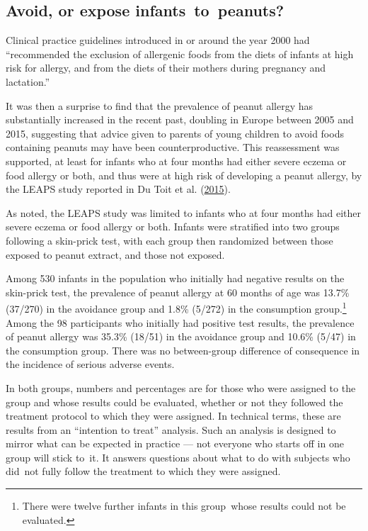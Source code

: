 \documentclass[
  10pt,
  b5paper]{book}
\begin{document}
\hypertarget{avoid-or-expose-infants-to-peanuts}{%
\subsection{Avoid, or expose infants~to~peanuts?}\label{avoid-or-expose-infants-to-peanuts}}

Clinical practice guidelines introduced in or around the year 2000 had
``recommended the exclusion of allergenic foods from the diets of infants
at high risk for allergy, and from the diets of their mothers during
pregnancy and lactation.''

It was then a surprise to find that the prevalence of peanut allergy has
substantially increased in the recent past, doubling in Europe between
2005 and 2015, suggesting that advice given to parents of young children
to avoid foods containing peanuts may have been counterproductive. This
reassessment was supported, at least for infants who at four months had
either severe eczema or food allergy or both, and thus were at high risk
of developing a peanut allergy, by the LEAPS study reported in
Du Toit et al. (\protect\hyperlink{ref-du2015randomized}{2015}).

As noted, the LEAPS study was limited to infants who at four months had
either severe eczema or food allergy or both. Infants were stratified
into two groups following a skin-prick test, with each group then
randomized between those exposed to peanut extract, and those not
exposed.

Among 530 infants in the population who initially had negative results
on the skin-prick test, the prevalence of peanut allergy at 60 months of
age was 13.7\% (37/270) in the avoidance group and 1.8\% (5/272) in the
consumption group.\footnote{There were twelve further infants in this group~whose
  results could not be evaluated.} Among the 98 participants who
initially had positive test results, the prevalence of peanut allergy
was 35.3\% (18/51) in the avoidance group and 10.6\% (5/47) in the
consumption group. There was no between-group difference of consequence
in the incidence of serious adverse events.

In both groups, numbers and percentages are for those who were assigned
to the group and whose results could be evaluated, whether or not they
followed the treatment protocol to which they were assigned. In
technical terms, these are results from an ``intention to treat''
analysis. Such an analysis is designed to mirror what can be expected in
practice --- not everyone who starts off in one group will stick to~it.
It answers questions about what to do with subjects who did~not fully
follow the treatment to which they were assigned.
\end{document}
